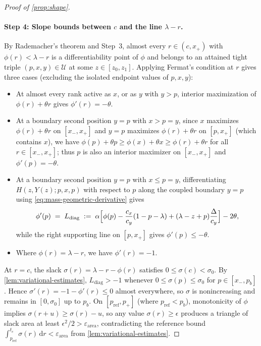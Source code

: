 \documentclass[11pt]{article}
\numberwithin{equation}{section}
\theoremstyle{plain}
\theoremstyle{definition}
\newcommand{\1}{\mathbf{1}}
\newcommand{\calU}{\mathcal{U}}
\begin{document}
\begin{proof}[Proof of {\cref{prop:shape}}]
\paragraph{Step 4: Slope bounds between $c$ and the line $\lambda - r$.}
By Rademacher's theorem and Step~3, almost every $r \in (c, x_+)$ with $\phi(r) < \lambda - r$ is a differentiability point of $\phi$ and belongs to an attained tight triple $(p, x, y) \in \calU$ at some $z \in [z_0, z_1]$. Applying Fermat's condition at $r$ gives three cases (excluding the isolated endpoint values of $p, x, y$):
\begin{itemize}
  \item At almost every rank active as $x$, or as $y$ with $y > p$, interior maximization of $\phi(r) + \theta r$ gives $\phi'(r) = -\theta$.
  \item At a boundary second position $y = p$ with $x > p = y$, since $x$ maximizes $\phi(r) + \theta r$ on $[x_-, x_+]$ and $y = p$ maximizes $\phi(r) + \theta r$ on $[p, x_+]$ (which contains $x$), we have $\phi(p) + \theta p \ge \phi(x) + \theta x \ge \phi(r) + \theta r$ for all $r \in [x_-, x_+]$; thus $p$ is also an interior maximizer on $[x_-, x_+]$ and $\phi'(p) = -\theta$.
  \item At a boundary second position $y = p$ with $x \le p = y$, differentiating $H(z, Y(z); p, x, p)$ with respect to $p$ along the coupled boundary $y = p$ using \cref{eq:mass-geometric-derivative} gives
  \begin{equation}
    \phi'(p) \;=\; L_{\mathrm{diag}} \;:=\; \alpha\Bigl[\phi(p) - \frac{c_x}{c_y}(1 - p - \lambda) + (\lambda - z + p)\frac{\Delta}{c_y}\Bigr] - 2\theta,
    \label{eq:diagonal-slope}
  \end{equation}
  while the right supporting line on $[p, x_+]$ gives $\phi'(p) \le -\theta$.
  \item Where $\phi(r) = \lambda - r$, we have $\phi'(r) = -1$.
\end{itemize}
At $r = c$, the slack $\sigma(r) = \lambda - r - \phi(r)$ satisfies $0 \le \sigma(c) < \sigma_0$. By \cref{lem:variational-estimates}, $L_{\mathrm{diag}} > -1$ whenever $0 \le \sigma(p) \le \sigma_0$ for $p \in [x_-, p_b]$. Hence $\sigma'(r) = -1 - \phi'(r) \le 0$ almost everywhere, so $\sigma$ is nonincreasing and remains in $[0, \sigma_0]$ up to $p_b$. On $[p_{\mathrm{ref}}, p_+]$ (where $p_{\mathrm{ref}} < p_b$), monotonicity of $\phi$ implies $\sigma(r + u) \ge \sigma(r) - u$, so any value $\sigma(r) \ge \epsilon$ produces a triangle of slack area at least $\epsilon^2/2 > \varepsilon_{\mathrm{area}}$, contradicting the reference bound $\int_{p_{\mathrm{ref}}}^{t_e} \sigma(r)\,\mathrm{d}r < \varepsilon_{\mathrm{area}}$ from \cref{lem:variational-estimates}.


\end{proof}
\end{document}
